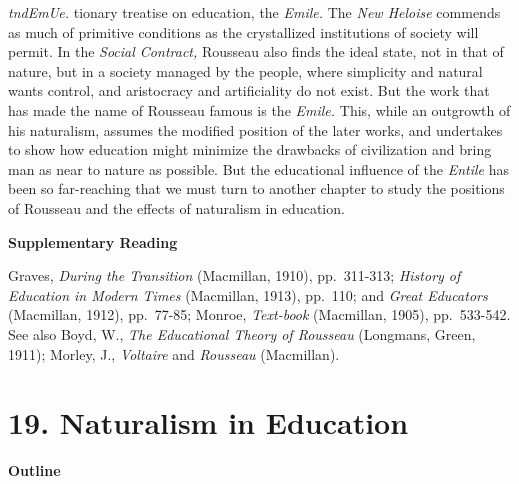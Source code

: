 \documentclass[]{book}
\begin{document}
\emph{tndEmUe.} tionary treatise on education, the \emph{Emile.} The \emph{New Heloise} commends as much of primitive conditions as the crystallized institutions of society will permit. In the \emph{Social Contract,} Rousseau also finds the ideal state, not in that of nature, but in a society managed by the people, where simplicity and natural wants control, and aristocracy and artificiality do not exist. But the work that has made the name of Rousseau famous is the \emph{Emile.} This, while an outgrowth of his naturalism, assumes the modified position of the later works, and undertakes to show how education might minimize the drawbacks of civilization and bring man as near to nature\protect\hypertarget{ch18.xmlux5cux23para.266.1.0.box.129.247.1049.196.q.60}{}{ as possible. But the educational influence of the \emph{Entile} has been so far-reaching that we must turn to another chapter to study the positions of Rousseau and the effects of naturalism in education.}

\textbf{Supplementary Reading}

Graves, \emph{During the Transition} (Macmillan, 1910), pp.~311-313; \emph{History of Education in Modern Times} (Macmillan, 1913), pp.~110; and \emph{Great Educators} (Macmillan, 1912), pp.~77-85; Monroe, \emph{Text-book} (Macmillan, 1905), pp.~533-542. See also Boyd, W., \emph{The Educational Theory of Rousseau} (Longmans, Green, 1911); Morley, J., \emph{Voltaire} and \emph{Rousseau} (Macmillan).

\hypertarget{naturalism-in-education}{%
\chapter{19. Naturalism in Education}\label{naturalism-in-education}}

\textbf{Outline}
\end{document}
